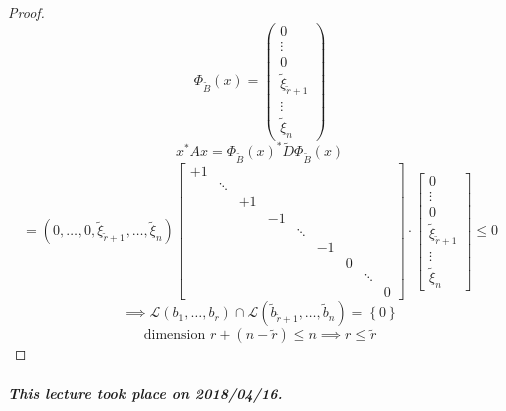 \documentclass{article}
\newcommand{\set}[1]{\left\{#1\right\}}
\newcommand{\dateref}[1]{\paragraph{\textit{This lecture took place on #1.}}}
\begin{document}
\begin{proof}
  \[
    \Phi_{\tilde B}(x) =
      \begin{pmatrix}
        0 \\ \vdots \\ 0 \\
        \tilde \xi_{\tilde r+1} \\
        \vdots \\ \tilde \xi_n
      \end{pmatrix}
  \] \[
    x^* Ax = \Phi_{\tilde B}(x)^* \tilde D \Phi_{\tilde B}(x)
  \] \[
    = (0, \dots, 0, \tilde \xi_{\tilde r + 1}, \dots, \tilde \xi_n)
    \begin{bmatrix}
       +1 &        &       &    &        &    &   &        & \\
          & \ddots &       &    &        &    &   &        & \\
          &        &    +1 &    &        &    &   &        & \\
          &        &       & -1 &        &    &   &        & \\
          &        &       &    & \ddots &    &   &        & \\
          &        &       &    &        & -1 &   &        & \\
          &        &       &    &        &    & 0 &        & \\
          &        &       &    &        &    &   & \ddots & \\
          &        &       &    &        &    &   &        & 0
    \end{bmatrix} \cdot \begin{bmatrix}
      0 \\ \vdots \\ 0 \\ \tilde \xi_{\tilde r+1} \\ \vdots \\ \tilde \xi_n
    \end{bmatrix} \leq 0
  \] \[
    \implies \mathcal L(b_1, \dots, b_r) \cap \mathcal L(\tilde b_{\tilde r+1}, \dots, \tilde b_n) = \set{0}
  \] \[
    \text{dimension } r + (n - \tilde r) \leq n \implies r \leq \tilde r
  \]
\end{proof}

\dateref{2018/04/16}
\end{document}

